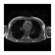 \begin{figure}[htb]
\begin{subfigure}[b]{0.25\textwidth}
        \end{subfigure}%
        \begin{subfigure}[b]{0.25\textwidth}
                \centering
                \includegraphics[width=.95\linewidth]{img_hyperopt/Chest_6810}
        \end{subfigure}
        
        \vspace*{2mm}
        

\end{figure}
